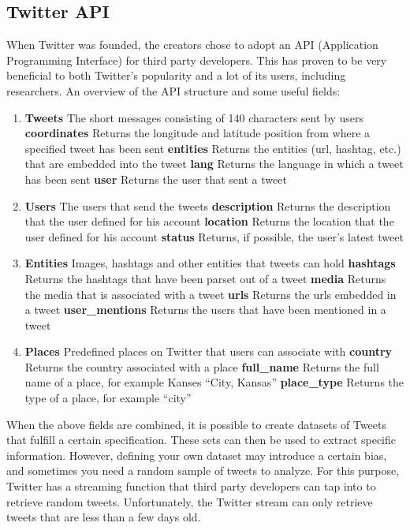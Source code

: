\documentclass{article}
\begin{document}
\subsection{Twitter API}

When Twitter was founded, the creators chose to adopt an API (Application Programming Interface) for third party developers. This has proven to be very
beneficial to both Twitter's popularity and a lot of its users, including researchers. An overview of the API structure and some useful fields\cite{TwitterDev}:

\begin{enumerate}
\item \textbf{Tweets} The short messages consisting of 140 characters sent by users
	\subitem \textbf{coordinates} Returns the longitude and latitude position from where a specified tweet has been sent
	\subitem \textbf{entities} Returns the entities (url, hashtag, etc.) that are embedded into the tweet
	\subitem \textbf{lang} Returns the language in which a tweet has been sent
	\subitem \textbf{user} Returns the user that sent a tweet
\item \textbf{Users} The users that send the tweets
	\subitem \textbf{description} Returns the description that the user defined for his account
	\subitem \textbf{location} Returns the location that the user defined for his account
	\subitem \textbf{status} Returns, if possible, the user's latest tweet
\item \textbf{Entities} Images, hashtags and other entities that tweets can hold
	\subitem \textbf{hashtags} Returns the hashtags that have been parset out of a tweet
	\subitem \textbf{media} Returns the media that is associated with a tweet
	\subitem \textbf{urls} Returns the urls embedded in a tweet
	\subitem \textbf{user\_mentions} Returns the users that have been mentioned in a tweet
\item \textbf{Places} Predefined places on Twitter that users can associate with
	\subitem \textbf{country} Returns the country associated with a place
	\subitem \textbf{full\_name} Returns the full name of a place, for example Kanses ``City, Kansas''
	\subitem \textbf{place\_type} Returns the type of a place, for example ``city''
\end{enumerate}

When the above fields are combined, it is possible to create datasets of Tweets that fulfill a certain specification. These sets can then be used to extract specific information. However, defining your own dataset may introduce a certain bias, and sometimes you need a random sample of tweets to analyze. For this purpose, Twitter has a streaming function that third party developers can tap into to retrieve random tweets. Unfortunately, the Twitter stream can only retrieve tweets that are less than a few days old.
\end{document}
